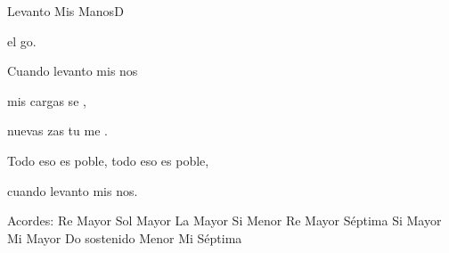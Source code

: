 \documentclass[12pt, spanish]{book}
\begin{document}
\begin{song}{Levanto Mis Manos}{D}
\begin{SBChorus}
            el go.

            Cuando levanto mis nos

            mis cargas se ,

            nuevas zas tu me .

            Todo eso es poble, todo eso es poble,

            cuando levanto mis nos.
        \end{SBChorus}


        \ifChordBk
        \begin{SBOpGroup}
            Acordes:
            \upchord{\D}\qquad Re Mayor \hfill
            \upchord{\G}\qquad Sol Mayor \hfill\null\break
            \upchord{\A}\qquad La Mayor \hfill
            \upchord{\Bm}\qquad Si Menor \hfill\null\break
            \upchord{\Dseven}\qquad Re Mayor S\'eptima \hfill
            \upchord{\B}\qquad Si Mayor \hfill\null\break
            \upchord{\E}\qquad Mi Mayor \hfill
            \upchord{\Csm}\qquad Do sostenido Menor \hfill\null\break
            \upchord{\Eseven}\qquad Mi S\'eptima \hfill
        \end{SBOpGroup}
        \fi
    \end{song}
\end{document}
